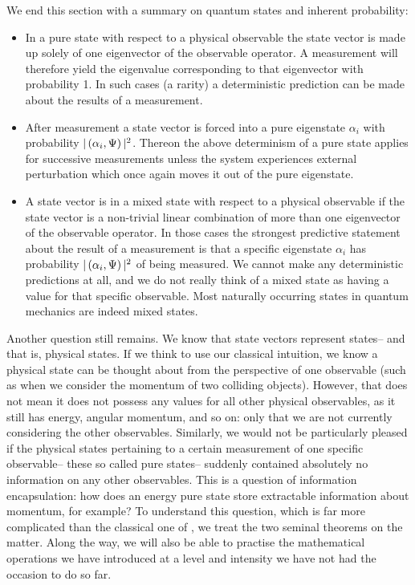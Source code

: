 We end this section with a summary on quantum states and inherent probability:
\begin{itemize}
    \item In a pure state with respect to a physical observable the state vector is made up solely of one eigenvector of the observable operator. A measurement will therefore yield the eigenvalue corresponding to that eigenvector with probability 1. In such cases (a rarity) a deterministic prediction can be made about the results of a measurement.
    \item After measurement a state vector is forced into a pure eigenstate $\alpha_{i}$ with probability $|\left(\alpha_{i},\Psi\right)|^2$. Thereon the above determinism of a pure state applies for successive measurements unless the system experiences external perturbation which once again moves it out of the pure eigenstate.
    \item A state vector is in a mixed state with respect to a physical observable if the state vector is a non-trivial linear combination of more than one eigenvector of the observable operator. In those cases the strongest predictive statement about the result of a measurement is that a specific eigenstate $\alpha_{i}$ has probability $|\left(\alpha_{i},\Psi\right)|^2$ of being measured. We cannot make any deterministic predictions at all, and we do not really think of a mixed state as having a value for that specific observable. Most naturally occurring states in quantum mechanics are indeed mixed states.
\end{itemize}
Another question still remains. We know that state vectors represent states-- and that is, physical states. If we think to use our classical intuition, we know a physical state can be thought about from the perspective of one observable (such as when we consider the momentum of two colliding objects). However, that does not mean it does not possess any values for all other physical observables, as it still has energy, angular momentum, and so on: only that we are not currently considering the other observables. Similarly, we would not be particularly pleased if the physical states pertaining to a certain measurement of one specific observable-- these so called pure states-- suddenly contained absolutely no information on any other observables. This is a question of information encapsulation: how does an energy pure state store extractable information about momentum, for example? To understand this question, which is far more complicated than the classical one of , we treat the two seminal theorems on the matter. Along the way, we will also be able to practise the mathematical operations we have introduced at a level and intensity we have not had the occasion to do so far.
